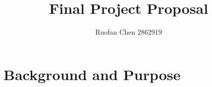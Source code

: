 \documentclass[a4paper]{article}
\title{Final Project Proposal}
\author{Ruofan Chen    2862919}
\date{}
\begin{document}
\maketitle
\vspace*{-1cm}


\section{Background and Purpose}

\end{document}
